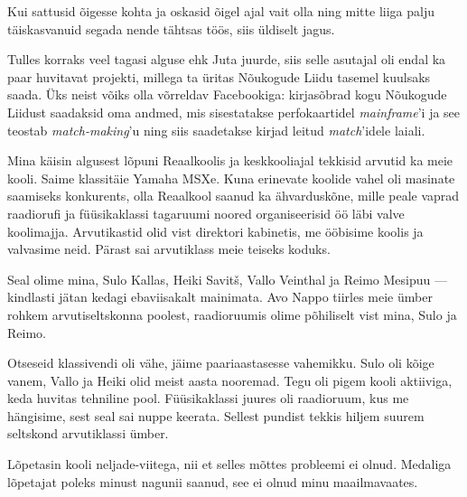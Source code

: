 
Kui sattusid õigesse kohta ja 
oskasid õigel ajal vait olla ning mitte liiga palju täiskasvanuid segada nende 
tähtsas töös, siis üldiselt jagus. 

Tulles korraks veel tagasi alguse ehk Juta juurde, 
siis selle asutajal oli endal ka paar huvitavat projekti, millega ta 
üritas Nõukogude Liidu tasemel kuulsaks saada. Üks neist võiks olla võrreldav 
Facebookiga: kirjasõbrad kogu Nõukogude Liidust 
saadaksid oma andmed, mis sisestatakse perfokaartidel 
\emph{mainframe}'i ja see teostab \emph{match-making}'u ning 
siis saadetakse kirjad leitud \emph{match}'idele laiali. 

Mina käisin algusest lõpuni Reaalkoolis ja keskkooliajal tekkisid arvutid ka meie kooli. Saime klassitäie Yamaha MSXe. Kuna erinevate koolide vahel oli masinate saamiseks 
konkurents, olla Reaalkool saanud ka ähvarduskõne, mille peale 
vaprad raadiorufi ja füüsikaklassi tagaruumi noored organiseerisid 
öö läbi valve koolimajja. Arvutikastid olid vist direktori kabinetis, me ööbisime koolis ja valvasime neid. Pärast sai
arvutiklass meie teiseks koduks.


Seal olime mina, Sulo Kallas, Heiki 
Savitš, Vallo Veinthal 
ja Reimo Mesipuu --- kindlasti jätan kedagi 
ebaviisakalt mainimata. Avo Nappo tiirles meie ümber 
rohkem arvutiseltskonna poolest, raadioruumis olime põhiliselt vist mina, Sulo 
ja Reimo.


Otseseid klassivendi oli vähe, jäime paariaastasesse vahemikku. 
Sulo oli kõige vanem, Vallo ja Heiki olid meist aasta nooremad. Tegu oli pigem kooli aktiiviga, keda huvitas tehniline pool. 
Füüsikaklassi juures oli raadioruum, kus me hängisime, sest seal sai 
nuppe keerata. Sellest pundist tekkis hiljem suurem seltskond arvutiklassi ümber. 


Lõpetasin kooli neljade-viitega, nii et selles mõttes probleemi ei olnud. Medaliga lõpetajat poleks minust nagunii saanud, see ei olnud minu maailmavaates.

